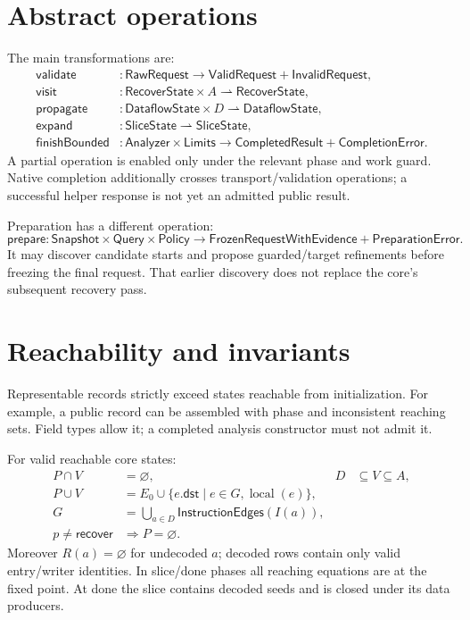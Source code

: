 \documentclass[11pt,a4paper]{article}
\newcommand{\ty}[1]{\mathsf{#1}}
\newcommand{\local}{\operatorname{local}}
\newcommand{\code}[1]{\texttt{\detokenize{#1}}}
\begin{document}
\section{Abstract operations}
\label{sec:operations}
The main transformations are:
\begin{align*}
 \ty{validate}&:\ty{RawRequest}\to\ty{ValidRequest}+\ty{InvalidRequest},\\
 \ty{visit}&:\ty{RecoverState}\times A\rightharpoonup\ty{RecoverState},\\
 \ty{propagate}&:\ty{DataflowState}\times D\rightharpoonup\ty{DataflowState},\\
 \ty{expand}&:\ty{SliceState}\rightharpoonup\ty{SliceState},\\
 \ty{finishBounded}&:\ty{Analyzer}\times\ty{Limits}
          \to\ty{CompletedResult}+\ty{CompletionError}.
\end{align*}
A partial operation is enabled only under the relevant phase and work guard.
Native completion additionally crosses transport/validation operations; a
successful helper response is not yet an admitted public result.

Preparation has a different operation:
\[
 \ty{prepare}:\ty{Snapshot}\times\ty{Query}\times\ty{Policy}
 \to \ty{FrozenRequestWithEvidence}+\ty{PreparationError}.
\]
It may discover candidate starts and propose guarded/target refinements before
freezing the final request. That earlier discovery does not replace the core's
subsequent recovery pass.

\section{Reachability and invariants}
\label{sec:reachable}
Representable records strictly exceed states reachable from initialization.
For example, a public \code{AnalysisState} record can be assembled with phase
\code{Done} and inconsistent reaching sets. Field types allow it; a completed
analysis constructor must not admit it.

For valid reachable core states:
\begin{align*}
 P\cap V&=\varnothing,& D&\subseteq V\subseteq A,\\
 P\cup V&=E_0\cup\{e.\ty{dst}\mid e\in G,\local(e)\},\\
 G&=\bigcup_{a\in D}\ty{InstructionEdges}(I(a)),\\
 p\ne\ty{recover}&\Longrightarrow P=\varnothing.
\end{align*}
Moreover $R(a)=\varnothing$ for undecoded $a$; decoded rows contain only valid
entry/writer identities. In slice/done phases all reaching equations are at
the fixed point. At done the slice contains decoded seeds and is closed under
its data producers.
\end{document}
